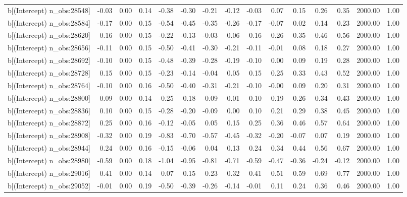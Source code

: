 \begin{table}[ht]
\begin{tabular}{rrrrrrrrrrrrrrr}
  b[(Intercept) n\_obs:28548] & -0.03 & 0.00 & 0.14 & -0.38 & -0.30 & -0.21 & -0.12 & -0.03 & 0.07 & 0.15 & 0.26 & 0.35 & 2000.00 & 1.00 \\ 
  b[(Intercept) n\_obs:28584] & -0.17 & 0.00 & 0.15 & -0.54 & -0.45 & -0.35 & -0.26 & -0.17 & -0.07 & 0.02 & 0.14 & 0.23 & 2000.00 & 1.00 \\ 
  b[(Intercept) n\_obs:28620] & 0.16 & 0.00 & 0.15 & -0.22 & -0.13 & -0.03 & 0.06 & 0.16 & 0.26 & 0.35 & 0.46 & 0.56 & 2000.00 & 1.00 \\ 
  b[(Intercept) n\_obs:28656] & -0.11 & 0.00 & 0.15 & -0.50 & -0.41 & -0.30 & -0.21 & -0.11 & -0.01 & 0.08 & 0.18 & 0.27 & 2000.00 & 1.00 \\ 
  b[(Intercept) n\_obs:28692] & -0.10 & 0.00 & 0.15 & -0.48 & -0.39 & -0.28 & -0.19 & -0.10 & 0.00 & 0.09 & 0.19 & 0.28 & 2000.00 & 1.00 \\ 
  b[(Intercept) n\_obs:28728] & 0.15 & 0.00 & 0.15 & -0.23 & -0.14 & -0.04 & 0.05 & 0.15 & 0.25 & 0.33 & 0.43 & 0.52 & 2000.00 & 1.00 \\ 
  b[(Intercept) n\_obs:28764] & -0.10 & 0.00 & 0.16 & -0.50 & -0.40 & -0.31 & -0.21 & -0.10 & -0.00 & 0.09 & 0.20 & 0.31 & 2000.00 & 1.00 \\ 
  b[(Intercept) n\_obs:28800] & 0.09 & 0.00 & 0.14 & -0.25 & -0.18 & -0.09 & 0.01 & 0.10 & 0.19 & 0.26 & 0.34 & 0.43 & 2000.00 & 1.00 \\ 
  b[(Intercept) n\_obs:28836] & 0.10 & 0.00 & 0.15 & -0.28 & -0.20 & -0.09 & 0.00 & 0.10 & 0.21 & 0.29 & 0.38 & 0.45 & 2000.00 & 1.00 \\ 
  b[(Intercept) n\_obs:28872] & 0.25 & 0.00 & 0.16 & -0.12 & -0.05 & 0.05 & 0.15 & 0.25 & 0.36 & 0.46 & 0.57 & 0.64 & 2000.00 & 1.00 \\ 
  b[(Intercept) n\_obs:28908] & -0.32 & 0.00 & 0.19 & -0.83 & -0.70 & -0.57 & -0.45 & -0.32 & -0.20 & -0.07 & 0.07 & 0.19 & 2000.00 & 1.00 \\ 
  b[(Intercept) n\_obs:28944] & 0.24 & 0.00 & 0.16 & -0.15 & -0.06 & 0.04 & 0.13 & 0.24 & 0.34 & 0.44 & 0.56 & 0.67 & 2000.00 & 1.00 \\ 
  b[(Intercept) n\_obs:28980] & -0.59 & 0.00 & 0.18 & -1.04 & -0.95 & -0.81 & -0.71 & -0.59 & -0.47 & -0.36 & -0.24 & -0.12 & 2000.00 & 1.00 \\ 
  b[(Intercept) n\_obs:29016] & 0.41 & 0.00 & 0.14 & 0.07 & 0.15 & 0.23 & 0.32 & 0.41 & 0.51 & 0.59 & 0.69 & 0.77 & 2000.00 & 1.00 \\ 
  b[(Intercept) n\_obs:29052] & -0.01 & 0.00 & 0.19 & -0.50 & -0.39 & -0.26 & -0.14 & -0.01 & 0.11 & 0.24 & 0.36 & 0.46 & 2000.00 & 1.00 \\ 

\end{tabular}
\end{table}
